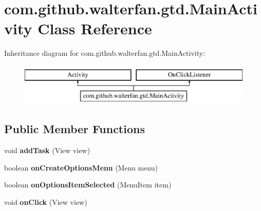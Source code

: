 \hypertarget{classcom_1_1github_1_1walterfan_1_1gtd_1_1MainActivity}{\section{com.\-github.\-walterfan.\-gtd.\-Main\-Activity Class Reference}
\label{classcom_1_1github_1_1walterfan_1_1gtd_1_1MainActivity}
}
Inheritance diagram for com.\-github.\-walterfan.\-gtd.\-Main\-Activity\-:\begin{figure}[H]
\begin{center}
\leavevmode
\includegraphics[height=2.000000cm]{classcom_1_1github_1_1walterfan_1_1gtd_1_1MainActivity}
\end{center}
\end{figure}
\subsection*{Public Member Functions}
\begin{DoxyCompactItemize}
\item 
\hypertarget{classcom_1_1github_1_1walterfan_1_1gtd_1_1MainActivity_a815fcc7cc35c40ab378c9619f85f2046}{void {\bfseries add\-Task} (View view)}\label{classcom_1_1github_1_1walterfan_1_1gtd_1_1MainActivity_a815fcc7cc35c40ab378c9619f85f2046}

\item 
\hypertarget{classcom_1_1github_1_1walterfan_1_1gtd_1_1MainActivity_a944bfa4f06700f8b2bad188a86ae0bd3}{boolean {\bfseries on\-Create\-Options\-Menu} (Menu menu)}\label{classcom_1_1github_1_1walterfan_1_1gtd_1_1MainActivity_a944bfa4f06700f8b2bad188a86ae0bd3}

\item 
\hypertarget{classcom_1_1github_1_1walterfan_1_1gtd_1_1MainActivity_aaed11889449cfc6c498e2c7f714bfd50}{boolean {\bfseries on\-Options\-Item\-Selected} (Menu\-Item item)}\label{classcom_1_1github_1_1walterfan_1_1gtd_1_1MainActivity_aaed11889449cfc6c498e2c7f714bfd50}

\item 
\hypertarget{classcom_1_1github_1_1walterfan_1_1gtd_1_1MainActivity_accdfaaa8c057e60730f4d977870c0dbe}{void {\bfseries on\-Click} (View view)}\label{classcom_1_1github_1_1walterfan_1_1gtd_1_1MainActivity_accdfaaa8c057e60730f4d977870c0dbe}

\end{DoxyCompactItemize}
